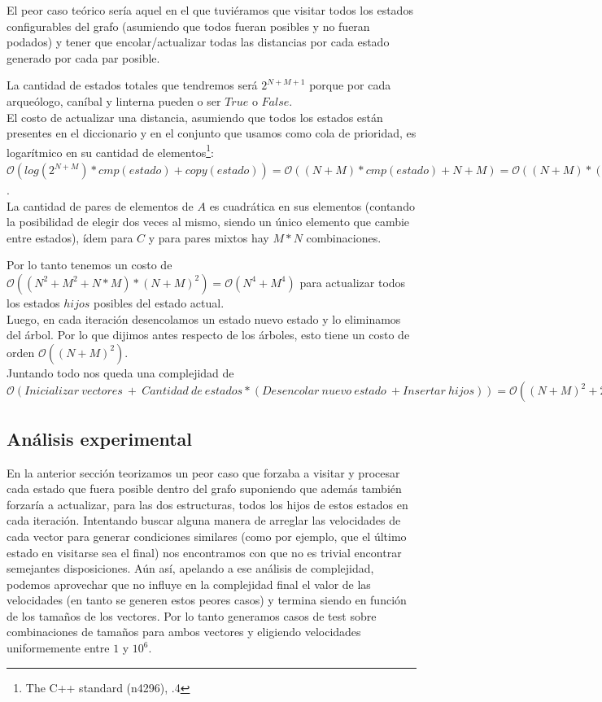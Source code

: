 El peor caso teórico sería aquel en el que tuviéramos que visitar todos los estados configurables del grafo (asumiendo que todos fueran posibles y no fueran podados) y tener que encolar/actualizar todas las distancias por cada estado generado por cada par posible.

La cantidad de estados totales que tendremos será $2^{N+M+1}$ porque por cada arqueólogo, caníbal y linterna pueden o ser $True$ o $False$. \\

El costo de actualizar una distancia, asumiendo que todos los estados están presentes en el diccionario y en el conjunto que usamos como cola de prioridad, es logarítmico en su cantidad de elementos\footnote{The C++ standard (n4296), .4}: $\mathcal{O}(log(2^{N+M}) * cmp(estado) + copy(estado)) = \mathcal{O}((N+M) * cmp(estado) + N+M) = \mathcal{O}((N+M) * (N+M) + N+M) = \mathcal{O}((N+M)^2)$. \\

La cantidad de pares de elementos de $A$ es cuadrática en sus elementos (contando la posibilidad de elegir dos veces al mismo, siendo un único elemento que cambie entre estados), ídem para $C$ y para pares mixtos hay $M*N$ combinaciones.

Por lo tanto tenemos un costo de $\mathcal{O}((N^2+M^2+N*M)*(N+M)^2) = \mathcal{O}(N^4+M^4)$ para actualizar todos los estados $hijos$ posibles del estado actual. \\

Luego, en cada iteración desencolamos un estado nuevo estado y lo eliminamos del árbol. Por lo que dijimos antes respecto de los árboles, esto tiene un costo de orden $\mathcal{O}((N+M)^2)$. \\

Juntando todo nos queda una complejidad de $\mathcal{O}(Inicializar\ vectores\ +\ Cantidad\ de\ estados*(Desencolar\ nuevo\ estado\ + Insertar\ hijos)) = \mathcal{O}((N+M)^2+2^{N+M}((N+M)^2+(N^4+M^4))) = \mathcal{O}(\ 2^{N+M}*(N^4+M^4)\ )$

\subsection{Análisis experimental}

En la anterior sección teorizamos un peor caso que forzaba a visitar y procesar cada estado que fuera posible dentro del grafo suponiendo que además también forzaría a actualizar, para las dos estructuras, todos los hijos de estos estados en cada iteración. Intentando buscar alguna manera de arreglar las velocidades de cada vector para generar condiciones similares (como por ejemplo, que el último estado en visitarse sea el final) nos encontramos con que no es trivial encontrar semejantes disposiciones. Aún así, apelando a ese análisis de complejidad, podemos aprovechar que no influye en la complejidad final el valor de las velocidades (en tanto se generen estos peores casos) y termina siendo en función de los tamaños de los vectores. Por lo tanto generamos casos de test sobre combinaciones de tamaños para ambos vectores y eligiendo velocidades uniformemente entre $1$ y $10^6$.
\\

